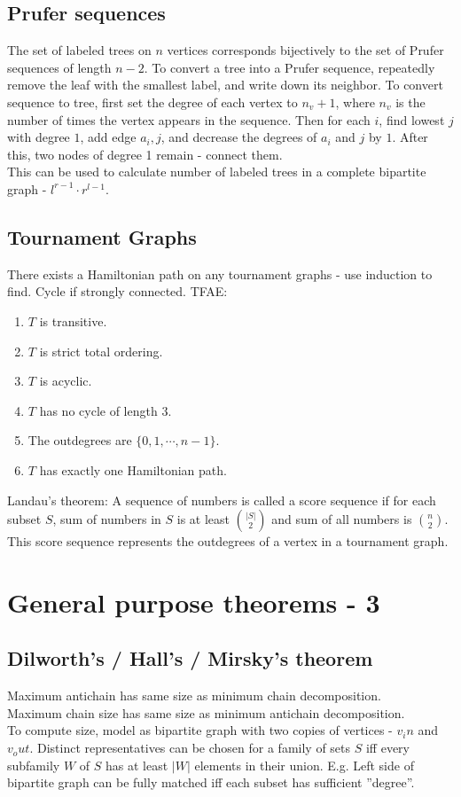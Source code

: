     \subsection{Prufer sequences}
    The set of labeled trees on $n$ vertices corresponds bijectively to the set of Prufer sequences of length $n-2$.
    To convert a tree into a Prufer sequence, repeatedly remove the leaf with the smallest label, and write down its neighbor.
    To convert sequence to tree, first set the degree of each vertex to $n_v + 1$, where $n_v$ is the number of times
    the vertex appears in the sequence. Then for each $i$, find lowest $j$ with degree $1$, add edge $a_i, j$, and decrease
    the degrees of $a_i$ and $j$ by $1$. After this, two nodes of degree 1 remain - connect them.\\
    This can be used to calculate number of labeled trees in a complete bipartite graph - $l^{r-1}\cdot r^{l-1}$.

    \subsection{Tournament Graphs}
    There exists a Hamiltonian path on any tournament graphs - use induction to find. Cycle if strongly connected. TFAE:
    \begin{enumerate}
      \item
      $T$ is transitive.
      \item
      $T$ is strict total ordering.
      \item
      $T$ is acyclic.
      \item
      $T$ has no cycle of length $3$.
      \item
      The outdegrees are $\{0, 1, \cdots, n-1\}$.
      \item
      $T$ has exactly one Hamiltonian path.
    \end{enumerate}
    Landau's theorem: A sequence of numbers is called a score sequence if for each subset $S$, sum of 
    numbers in $S$ is at least $\binom{|S|}{2}$ and sum of all numbers is $\binom{n}{2}$.\\
    This score sequence represents the outdegrees of a vertex in a tournament graph.

 \section{General purpose theorems - 3}

    \subsection{Dilworth's / Hall's / Mirsky's theorem}
    Maximum antichain has same size as minimum chain decomposition.\\
    Maximum chain size has same size as minimum antichain decomposition.\\
    To compute size, model as bipartite graph with two copies of vertices - $v_in$ and $v_out$.
    Distinct representatives can be chosen for a family of sets $S$ iff every subfamily $W$ of $S$ has at least $|W|$
    elements in their union. E.g. Left side of bipartite graph can be fully matched iff each subset has sufficient ”degree”.

